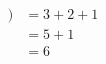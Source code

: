 \documentclass[preview]{standalone}
\begin{document}
\begin{align*}
) &= 3 + 2 + 1\\ &= 5 + 1 \\ &= 6
\end{align*}
\end{document}
